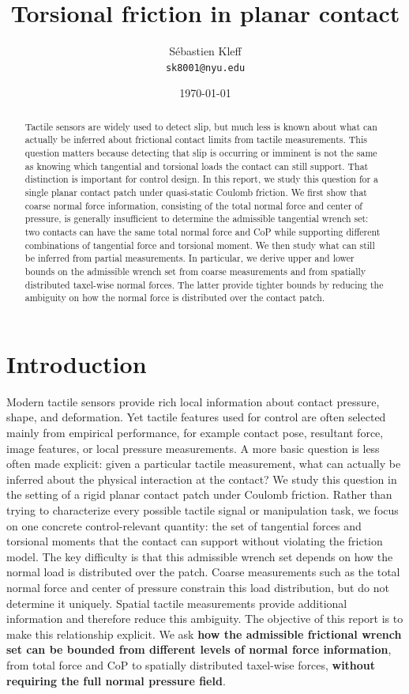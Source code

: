 \documentclass[11pt,a4paper]{article}
\title{\textbf{Torsional friction in planar contact}}
\author{Sébastien Kleff\\[2pt]
\small\texttt{sk8001@nyu.edu}}
\date{\today}
\theoremstyle{proposition}
\begin{document}
\maketitle


\begin{abstract}
Tactile sensors are widely used to detect slip, but much less is known about what can actually be inferred about frictional contact limits from tactile measurements. This question matters because detecting that slip is occurring or imminent is not the same as knowing which tangential and torsional loads the contact can still support. That distinction is important for control design. In this report, we study this question for a single planar contact patch under quasi-static Coulomb friction. We first show that coarse normal force information, consisting of the total normal force and center of pressure, is generally insufficient to determine the admissible tangential wrench set: two contacts can have the same total normal force and CoP while supporting different combinations of tangential force and torsional moment. We then study what can still be inferred from partial measurements. In particular, we derive upper and lower bounds on the admissible wrench set from coarse measurements and from spatially distributed taxel-wise normal forces. The latter provide tighter bounds by reducing the ambiguity on how the normal force is distributed over the contact patch.
\end{abstract}

\section{Introduction}
Modern tactile sensors provide rich local information about contact pressure, shape, and deformation. Yet tactile features used for control are often selected mainly from empirical performance, for example contact pose, resultant force, image features, or local pressure measurements. A more basic question is less often made explicit: given a particular tactile measurement, what can actually be inferred about the physical interaction at the contact?
We study this question in the setting of a rigid planar contact patch under Coulomb friction. Rather than trying to characterize every possible tactile signal or manipulation task, we focus on one concrete control-relevant quantity: the set of tangential forces and torsional moments that the contact can support without violating the friction model.
The key difficulty is that this admissible wrench set depends on how the normal load is distributed over the patch. Coarse measurements such as the total normal force and center of pressure constrain this load distribution, but do not determine it uniquely. Spatial tactile measurements provide additional information and therefore reduce this ambiguity.
The objective of this report is to make this relationship explicit. We ask \textbf{how the admissible frictional wrench set can be bounded from different levels of normal force information}, from total force and CoP to spatially distributed taxel-wise forces, \textbf{without requiring the full normal pressure field}.
\end{document}
